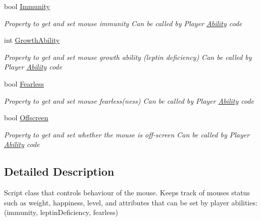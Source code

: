 \begin{DoxyCompactItemize}
\item 
bool \hyperlink{class_mouse_a7916f98be8b4afcd422794bbf8994e25}{Immunity}
\begin{DoxyCompactList}\small\item\em Property to get and set mouse immunity Can be called by Player \hyperlink{class_ability}{Ability} code \end{DoxyCompactList}\item 
int \hyperlink{class_mouse_a58afb42b0fa0f4d9fb30795d68a86b82}{Growth\+Ability}
\begin{DoxyCompactList}\small\item\em Property to get and set mouse growth ability (leptin deficiency) Can be called by Player \hyperlink{class_ability}{Ability} code \end{DoxyCompactList}\item 
bool \hyperlink{class_mouse_aa866c3f02e0e310895d8e5ef4bca6db5}{Fearless}
\begin{DoxyCompactList}\small\item\em Property to get and set mouse fearless(ness) Can be called by Player \hyperlink{class_ability}{Ability} code \end{DoxyCompactList}\item 
bool \hyperlink{class_mouse_a4bdbd8793c98c76e0ed8b00717d34325}{Offscreen}
\begin{DoxyCompactList}\small\item\em Property to get and set whether the mouse is off-\/screen Can be called by Player \hyperlink{class_ability}{Ability} code \end{DoxyCompactList}\end{DoxyCompactItemize}


\subsection{Detailed Description}
Script class that controls behaviour of the mouse. Keeps track of mouses status such as weight, happiness, level, and attributes that can be set by player abilities\+: (immunity, leptin\+Deficiency, fearless) 



